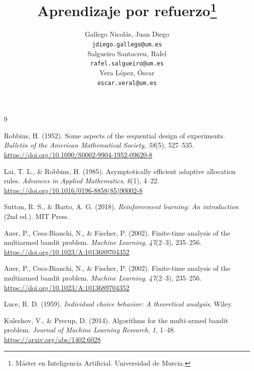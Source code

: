 \documentclass[a4paper, 10pt, twocolumn]{report}
\title{Aprendizaje por refuerzo\footnote{Máster en Inteligencia Artificial. Universidad de Murcia.}}
\author{
Gallego Nicolás, Juan Diego 	\\
\texttt{jdiego.gallego@um.es} \\[0.25cm]
Salgueiro Santacreu, Rafel 	\\
\texttt{rafel.salgueiro@um.es} \\[0.25cm]
Vera López, Óscar 	\\
\texttt{oscar.veral@um.es}}
\begin{document}
\maketitle %


\tableofcontents
\clearpage
{}



\begin{thebibliography}{9} %
	\setlength{\itemsep}{0pt} %
  	\setlength{\parsep}{0pt}    %
  	
     Robbins, H. (1952). Some aspects of the sequential design of experiments. \textit{Bulletin of the American Mathematical Society}, \textit{58}(5), 527--535. \href{https://doi.org/10.1090/S0002-9904-1952-09620-8}{https://doi.org/10.1090/S0002-9904-1952-09620-8}

     Lai, T. L., \& Robbins, H. (1985). Asymptotically efficient adaptive allocation rules. \textit{Advances in Applied Mathematics}, \textit{6}(1), 4--22. \href{https://doi.org/10.1016/0196-8858(85)90002-8}{https://doi.org/10.1016/0196-8858(85)90002-8}

     Sutton, R. S., \& Barto, A. G. (2018). \textit{Reinforcement learning: An introduction} (2nd ed.). MIT Press.

     Auer, P., Cesa-Bianchi, N., \& Fischer, P. (2002). Finite-time analysis of the multiarmed bandit problem. \textit{Machine Learning}, \textit{47}(2--3), 235--256. \href{https://doi.org/10.1023/A:1013689704352}{https://doi.org/10.1023/A:1013689704352}

     Auer, P., Cesa-Bianchi, N., \& Fischer, P. (2002). Finite-time analysis of the multiarmed bandit problem. \textit{Machine Learning}, \textit{47}(2--3), 235--256. \href{https://doi.org/10.1023/A:1013689704352}{https://doi.org/10.1023/A:1013689704352}

     Luce, R. D. (1959). \textit{Individual choice behavior: A theoretical analysis}. Wiley.

     Kuleshov, V., \& Precup, D. (2014). Algorithms for the multi-armed bandit problem. \textit{Journal of Machine Learning Research}, \textit{1}, 1--48. \href{https://arxiv.org/abs/1402.6028}{https://arxiv.org/abs/1402.6028}


\end{thebibliography}
\end{document}
